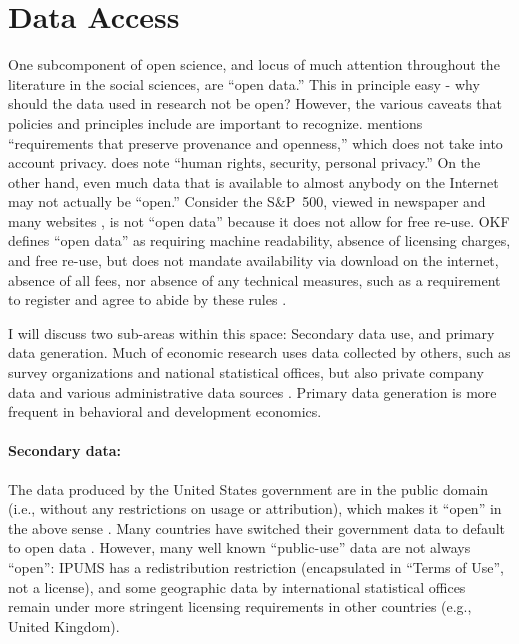 \documentclass{article}
\providecommand{\DIFaddbegin}{} %
\providecommand{\DIFaddend}{} %
\providecommand{\DIFdelbegin}{} %
\providecommand{\DIFdelend}{} %
\begin{document}


\section{Data Access}
\label{sec:data_access}

One subcomponent of open science, and locus of much attention throughout the literature in the social sciences, are ``open data.'' This in principle easy - why should the data used in research not be open? However, the various caveats that policies and principles include are important to recognize. \DIFdelbegin %
\DIFdelend \DIFaddbegin \parencite[OKF]{open_knowledge_foundation_defining_2024} \DIFaddend mentions ``requirements that preserve provenance and openness,'' which does not take into account privacy. \citet{unesco_understanding_2022} does note  ``human rights, security, personal privacy.'' On the other hand, even much data that is available to almost anybody on the Internet may not actually be ``open.''  Consider the S\&P~500, viewed in newspaper and many websites \parencite[e.g.][]{sp_dow_jones_indices_llc_sp_2025}, is not ``open data'' because it does not allow for free re-use. OKF defines 
``open data'' as requiring machine readability, absence of licensing charges, and free re-use, but does not mandate availability via download on the internet, absence of all fees, nor absence of any technical measures, such as a requirement to register and agree to abide by these rules \citep{open_knowledge_foundation_defining_2024}. 

I will discuss two sub-areas within this space: Secondary data use, and primary data generation. Much of economic research uses data collected by others, such as survey organizations and national statistical offices, but also private company data and various administrative data sources \citep[``organic data'', ][]{groves_designed_2011,groves_three_2011}. Primary data generation is more frequent in behavioral and development economics. 

\paragraph{Secondary data:} The data produced by the United States government are in the public domain (i.e., without any restrictions on usage or attribution), which makes it ``open'' in the above sense \citep[Copyright Act of 1976, ][]{wikipedia_copyright_2025}. Many countries have switched their government data to default to open data \parencite{statistics_canada_statistics_2012,uk_government_open_2014}. However, many well known ``public-use'' data are not always ``open'': IPUMS has a redistribution restriction (encapsulated in ``Terms of Use'', not a license), and some geographic data by international statistical offices remain under more stringent licensing requirements in other countries (e.g., United Kingdom).
\end{document}
